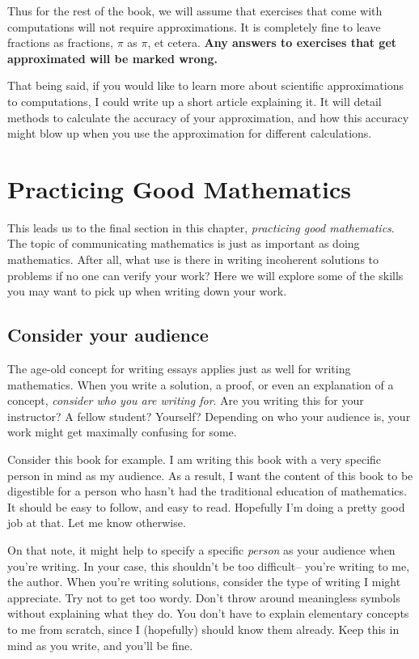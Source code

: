 Thus for the rest of the book, we will assume that exercises that come with computations will not require approximations. It is completely fine to leave fractions as fractions, $\pi$ as $\pi$, et cetera. \textbf{Any answers to exercises that get approximated will be marked wrong.}

That being said, if you would like to learn more about scientific approximations to computations, I could write up a short article explaining it. It will detail methods to calculate the accuracy of your approximation, and how this accuracy might blow up when you use the approximation for different calculations.

\section{Practicing Good Mathematics}

This leads us to the final section in this chapter, \textit{practicing good mathematics}. The topic of communicating mathematics is just as important as doing mathematics. After all, what use is there in writing incoherent solutions to problems if no one can verify your work? Here we will explore some of the skills you may want to pick up when writing down your work.

\subsection{Consider your audience}

The age-old concept for writing essays applies just as well for writing mathematics. When you write a solution, a proof, or even an explanation of a concept, \textit{consider who you are writing for}. Are you writing this for your instructor? A fellow student? Yourself? Depending on who your audience is, your work might get maximally confusing for some. 

Consider this book for example. I am writing this book with a very specific person in mind as my audience. As a result, I want the content of this book to be digestible for a person who hasn't had the traditional education of mathematics. It should be easy to follow, and easy to read. Hopefully I'm doing a pretty good job at that. Let me know otherwise.

On that note, it might help to specify a specific \textit{person} as your audience when you're writing. In your case, this shouldn't be too difficult-- you're writing to me, the author. When you're writing solutions, consider the type of writing I might appreciate. Try not to get too wordy. Don't throw around meaningless symbols without explaining what they do. You don't have to explain elementary concepts to me from scratch, since I (hopefully) should know them already. Keep this in mind as you write, and you'll be fine.

